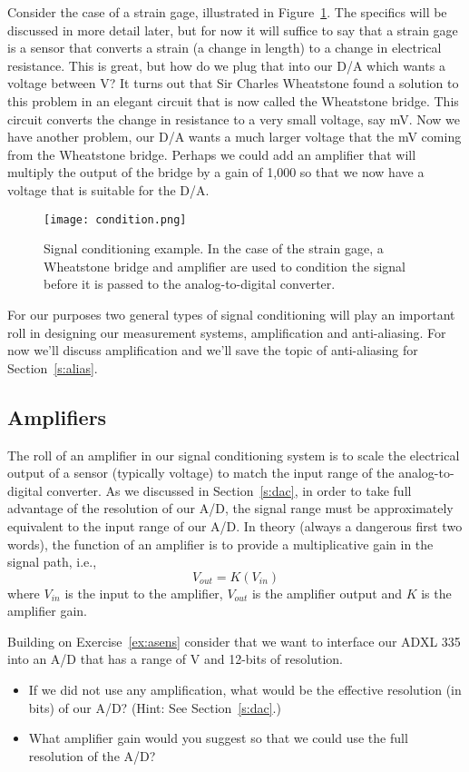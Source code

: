 Consider the case of a strain gage, illustrated in Figure~\ref{f:condition}.  The specifics will be discussed in more detail later, but for now it will suffice to say that a strain gage is a sensor that converts a strain (a change in length) to a change in electrical resistance.  This is great, but how do we plug that into our D/A which wants a voltage between \unit[0--10]{V}?  It turns out that Sir Charles Wheatstone found a solution to this problem in an elegant circuit that is now called the Wheatstone bridge.  This circuit converts the change in resistance to a very small voltage, say \unit[0--10]{mV}.  Now we have another problem, our D/A wants a much larger voltage that the \unit[10]{mV} coming from the Wheatstone bridge.  Perhaps we could add an amplifier that will multiply the output of the bridge by a gain of 1,000 so that we now have a  voltage that is suitable for the D/A.  

\begin{figure}[hbt!]
\centering
\texttt{[image: condition.png]}
\caption{Signal conditioning example.  In the case of the strain gage, a Wheatstone bridge and amplifier are used to condition the signal before it is passed to the analog-to-digital converter.}
\label{f:condition}
\end{figure}

For our purposes two general types of signal conditioning will play an important roll in designing our measurement systems, amplification and anti-aliasing.  For now we'll discuss amplification and we'll save the topic of anti-aliasing for Section~\ref{s:alias}.

\subsection{Amplifiers}
The roll of an amplifier in our signal conditioning system is to scale the electrical output of a sensor (typically voltage) to match the input range of the analog-to-digital converter.  As we discussed in Section~\ref{s:dac}, in order to take full advantage of the resolution of our A/D, the signal range must be approximately equivalent to the input range of our A/D.  In theory (always a dangerous first two words), the function of an amplifier is to provide a multiplicative gain in the signal path, i.e., 
\[
V_{out} = K\left(V_{in}\right)
\]
where $V_{in}$ is the input to the amplifier, $V_{out}$ is the amplifier output and $K$ is the amplifier gain. 

\begin{ex}
Building on Exercise~\ref{ex:asens} consider that we want to interface our ADXL 335 into an A/D that has a range of \unit[0--10]{V} and 12-bits of resolution.  
\begin{itemize}
\item If we did not use any amplification, what would be the effective resolution (in bits) of our A/D?  (Hint: See Section~\ref{s:dac}.)
\item What amplifier gain would you suggest so that we could use the full resolution of the A/D?
\end{itemize}
\end{ex}

